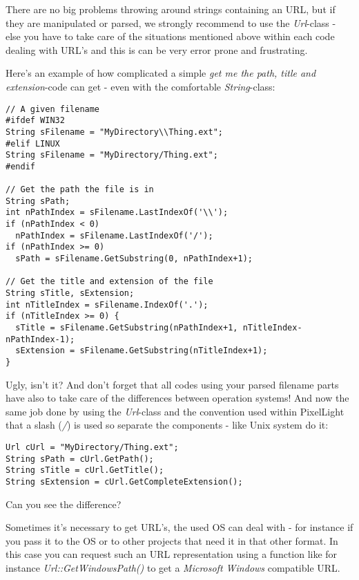 There are no big problems throwing around strings containing an URL, but if they are manipulated or parsed, we strongly recommend to use the \emph{Url}-class - else you have to take care of the situations mentioned above within each code dealing with URL's and this is can be very error prone and frustrating.

Here's an example of how complicated a simple \emph{get me the path, title and extension}-code can get - even with the comfortable \emph{String}-class:

\begin{lstlisting}[caption=File path\, title and extension without using the Url-class]
// A given filename
#ifdef WIN32
String sFilename = "MyDirectory\\Thing.ext";
#elif LINUX
String sFilename = "MyDirectory/Thing.ext";
#endif

// Get the path the file is in
String sPath;
int nPathIndex = sFilename.LastIndexOf('\\');
if (nPathIndex < 0)
  nPathIndex = sFilename.LastIndexOf('/');
if (nPathIndex >= 0)
  sPath = sFilename.GetSubstring(0, nPathIndex+1);

// Get the title and extension of the file
String sTitle, sExtension;
int nTitleIndex = sFilename.IndexOf('.');
if (nTitleIndex >= 0) {
  sTitle = sFilename.GetSubstring(nPathIndex+1, nTitleIndex-nPathIndex-1);
  sExtension = sFilename.GetSubstring(nTitleIndex+1);
}
\end{lstlisting}

Ugly, isn't it? And don't forget that all codes using your parsed filename parts have also to take care of the differences between operation systems! And now the same job done by using the \emph{Url}-class and the convention used within PixelLight that a slash (\emph{/}) is used so separate the components - like Unix system do it:

\begin{lstlisting}[caption=File path\, title and extension using the Url class]
Url cUrl = "MyDirectory/Thing.ext";
String sPath = cUrl.GetPath();
String sTitle = cUrl.GetTitle();
String sExtension = cUrl.GetCompleteExtension();
\end{lstlisting}

Can you see the difference?

Sometimes it's necessary to get URL's, the used OS can deal with - for instance if you pass it to the OS or to other projects that need it in that other format. In this case you can request such an URL representation using a function like for instance \emph{Url::GetWindowsPath()} to get a \emph{Microsoft Windows} compatible URL.

